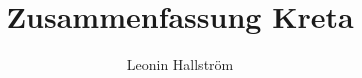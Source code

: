 \documentclass{article}
\begin{document}
\title{Zusammenfassung Kreta}
\author{Leonin Hallström}

\maketitle
\end{document}
